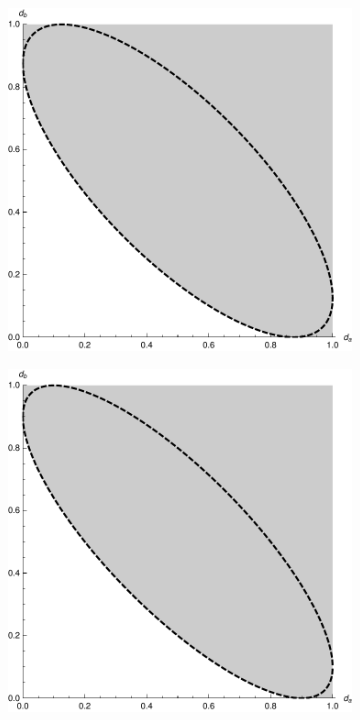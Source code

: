 \begin{figure}
\begin{center}
\begin{subfigure}[t]{0.4\textwidth}
    \end{subfigure}\\
    \begin{subfigure}[t]{0.4\textwidth}
      \includegraphics[width=\textwidth]{fourier-ur-8}
    \end{subfigure}\quad
    \begin{subfigure}[t]{0.4\textwidth}
      \includegraphics[width=\textwidth]{fourier-ur-10}
    \end{subfigure}\\
\end{center}
\end{figure}

